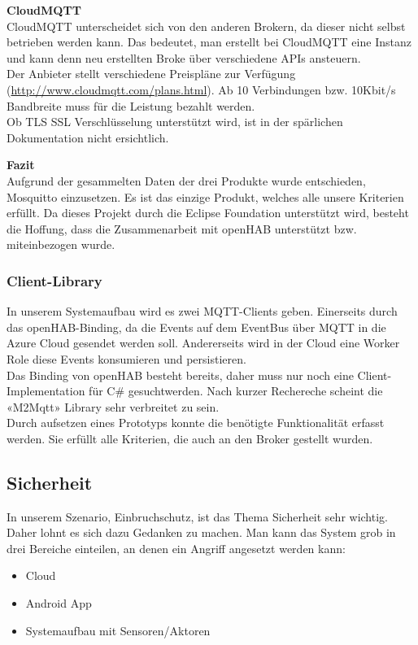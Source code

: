 \textbf{CloudMQTT} \\
CloudMQTT unterscheidet sich von den anderen Brokern, da dieser nicht selbst betrieben werden kann. Das bedeutet, man erstellt bei CloudMQTT eine Instanz und kann denn neu erstellten Broke über verschiedene APIs ansteuern. \\
Der Anbieter stellt verschiedene Preispläne zur Verfügung (\url{http://www.cloudmqtt.com/plans.html}). Ab 10 Verbindungen bzw. 10Kbit/s Bandbreite muss für die Leistung bezahlt werden. \\
Ob TLS SSL Verschlüsselung unterstützt wird, ist in der spärlichen Dokumentation nicht ersichtlich.

\textbf{Fazit} \\
Aufgrund der gesammelten Daten der drei Produkte wurde entschieden, Mosquitto einzusetzen. Es ist das einzige Produkt, welches alle unsere Kriterien erfüllt. Da dieses Projekt durch die Eclipse Foundation unterstützt wird, besteht die Hoffung, dass die Zusammenarbeit mit openHAB unterstützt bzw. miteinbezogen wurde.

\subsubsection{Client-Library}
In unserem Systemaufbau wird es zwei MQTT-Clients geben. Einerseits durch das openHAB-Binding, da die Events auf dem EventBus über MQTT in die Azure Cloud gesendet werden soll. Andererseits wird in der Cloud eine Worker Role diese Events konsumieren und persistieren. \\
Das Binding von openHAB besteht bereits, daher muss nur noch eine Client-Implementation für C\# gesuchtwerden. Nach kurzer Rechereche scheint die «M2Mqtt» Library sehr verbreitet zu sein. \\
Durch aufsetzen eines Prototyps konnte die benötigte Funktionalität erfasst werden. Sie erfüllt alle Kriterien, die auch an den Broker gestellt wurden.

\subsection{Sicherheit}
In unserem Szenario, Einbruchschutz, ist das Thema Sicherheit sehr wichtig. Daher lohnt es sich dazu  Gedanken zu machen. Man kann das System grob in drei Bereiche einteilen, an denen ein Angriff angesetzt werden kann:
\begin{itemize}
	\item Cloud
	\item Android App
	\item Systemaufbau mit Sensoren/Aktoren
\end{itemize}

